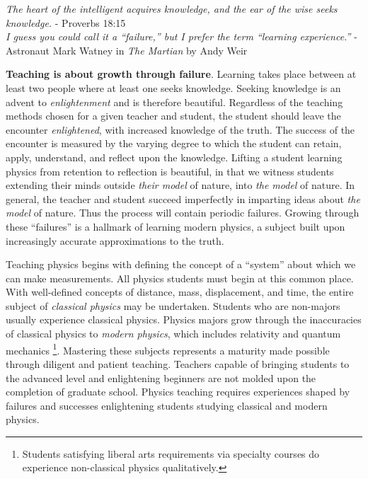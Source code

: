 \documentclass[../../main.tex]{subfiles}
\begin{document}
\epigraph{\textit{The heart of the intelligent acquires knowledge, and the ear of the wise seeks knowledge.} - Proverbs 18:15 \\ \vspace{0.1cm} \textit{I guess you could call it a ``failure,'' but I prefer the term ``learning experience.''} - Astronaut Mark Watney in \textit{The Martian} by Andy Weir}{}

\textbf{Teaching is about growth through failure}.  Learning takes place between at least two people where at least one seeks knowledge.  Seeking knowledge is an advent to \textit{enlightenment} and is therefore beautiful.  Regardless of the teaching methods chosen for a given teacher and student, the student should leave the encounter \textit{enlightened}, with increased knowledge of the truth.  The success of the encounter is measured by the varying degree to which the student can retain, apply, understand, and reflect upon the knowledge.  Lifting a student learning physics from retention to reflection is beautiful, in that we witness students extending their minds outside \textit{their model} of nature, into \textit{the model} of nature.  In general, the teacher and student succeed imperfectly in imparting ideas about \textit{the model} of nature.  Thus the process will contain periodic failures.  Growing through these ``failures'' is a hallmark of learning modern physics, a subject built upon increasingly accurate approximations to the truth. \\ \hspace{0.1cm}

Teaching physics begins with defining the concept of a ``system'' about which we can make measurements.  All physics students must begin at this common place.  With well-defined concepts of distance, mass, displacement, and time, the entire subject of \textit{classical physics} may be undertaken.  Students who are non-majors usually experience classical physics.  Physics majors grow through the inaccuracies of classical physics to \textit{modern physics}, which includes relativity and quantum mechanics \footnote{Students satisfying liberal arts requirements via specialty courses do experience non-classical physics qualitatively.}.  Mastering these subjects represents a maturity made possible through diligent and patient teaching.  Teachers capable of bringing students to the advanced level and enlightening beginners are not molded upon the completion of graduate school.  Physics teaching requires experiences shaped by failures and successes enlightening students studying classical and modern physics. \\ \hspace{0.1cm}
\end{document}
